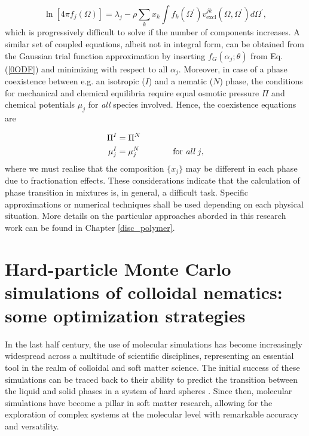 {\begin{equation}
\ln[4\pi f_{j}(\Omega)]=\lambda_{j} - \rho \sum_{k} x_{k} \int f_{k}(\Omega^{\prime})v_{\text{excl}}^{jk}(\Omega,\Omega^{\prime})
d\Omega^{\prime}, \label{0inteqmulti}
\end{equation}
which  is  progressively difficult to solve if the number of components increases. A similar set of coupled equations, albeit not in integral form, can be obtained from the Gaussian trial function approximation by inserting $f_{G}(\alpha_{j};\theta)$ from Eq. (\ref{0ODF}) and minimizing with respect to all $\alpha_{j}$. Moreover, in case of a phase coexistence between e.g. an isotropic ($I$) and a nematic ($N$) phase, the conditions for mechanical and chemical equilibria require equal osmotic pressure $\Pi$ and chemical potentials $\mu_{j}$ for {\em all} species involved. Hence, the coexistence equations are

\begin{align}
\Pi^{I}&=\Pi^{N} \nonumber \\
\mu^{I}_{j}&=\mu^{N}_{j} \qquad\qquad \text{for {\em all} $j$},
\end{align}
where we must realise that the composition $\{x_{j}\}$ may be different in each phase due to fractionation effects. These considerations indicate that the calculation of phase transition in mixtures is, in general, a difficult task. Specific approximations or numerical techniques shall be used depending on each physical situation. More details on the particular approaches aborded in this research work can be found in Chapter \ref{disc_polymer}.
}

\section[HPMC simulations of colloidal nematics]{Hard-particle Monte Carlo simulations of colloidal nematics: some optimization strategies}

In the last half century, the use of molecular simulations has become increasingly widespread across a multitude of scientific disciplines, representing an essential tool in the realm of colloidal and soft matter science. The initial success of these simulations can be traced back to their ability to predict the transition between the liquid and solid phases in a system of hard spheres \cite{ALDER57,WOOD57}. Since then, molecular simulations have become a pillar in soft matter research, allowing for the exploration of complex systems at the molecular level with remarkable accuracy and versatility.

